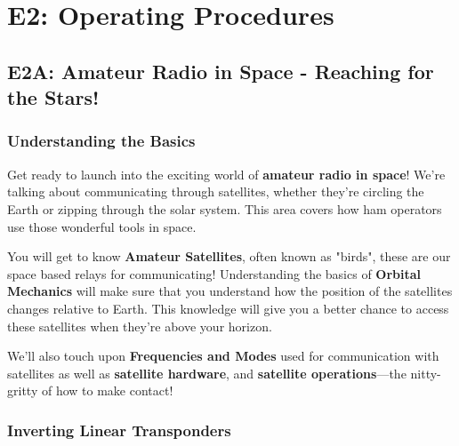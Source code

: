 
\chapter{E2: Operating Procedures}


\section{E2A: Amateur Radio in Space - Reaching for the Stars!}

\subsection*{Understanding the Basics}
Get ready to launch into the exciting world of \textcolor{myblue}{\textbf{amateur radio in space}}! We’re talking about communicating through satellites, whether they're circling the Earth or zipping through the solar system. This area covers how ham operators use those wonderful tools in space.
\par
    You will get to know  \textcolor{myblue}{\textbf{Amateur Satellites}}, often known as "birds", these are our space based relays for communicating! Understanding the basics of \textcolor{myblue}{\textbf{Orbital Mechanics}} will make sure that you understand how the position of the satellites changes relative to Earth. This knowledge will give you a better chance to access these satellites when they're above your horizon.
\par
We'll also touch upon  \textcolor{myblue}{\textbf{Frequencies and Modes}} used for communication with satellites as well as \textcolor{myblue}{\textbf{satellite hardware}}, and \textcolor{myblue}{\textbf{satellite operations}}—the nitty-gritty of how to make contact!



\subsection{Inverting Linear Transponders}

